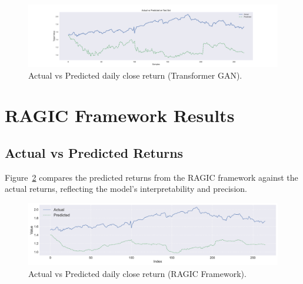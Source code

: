 \begin{figure}[h!]
    \centering
    \includegraphics[width=\textwidth]{Images/_8_ActualVsPred_c.pdf}
    \caption{Actual vs Predicted daily close return (Transformer GAN).}
    \label{fig:tgan_actual_vs_pred}
\end{figure}

\section{RAGIC Framework Results}
\subsection{Actual vs Predicted Returns}
Figure~\ref{fig:ragic_actual_vs_pred} compares the predicted returns from the RAGIC framework against the actual returns, reflecting the model’s interpretability and precision.


\begin{figure}[h!]
    \centering
    \includegraphics[width=\textwidth]{Images/9_Act_vs_Pred_Point.pdf}
    \caption{Actual vs Predicted daily close return (RAGIC Framework).}
    \label{fig:ragic_actual_vs_pred}
\end{figure}

